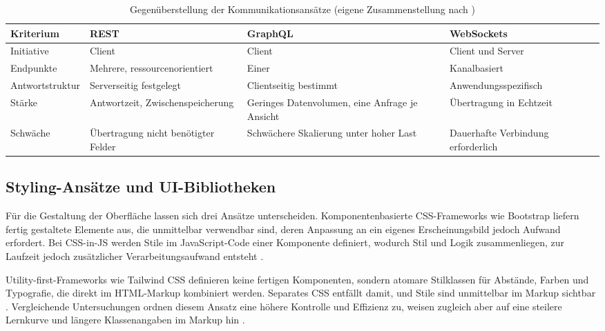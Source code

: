 \begin{table}[htbp]
\centering
\caption{Gegenüberstellung der Kommunikationsansätze (eigene
Zusammenstellung nach \cite{fielding_rest, lawi_graphql_rest,
lloyd_graphql_rest, rfc6455})}
\label{tab:kommunikation}
\small
\begin{tabular}{|p{2.6cm}|p{3.2cm}|p{3.2cm}|p{3.2cm}|}
\hline
\textbf{Kriterium} & \textbf{\acs{REST}} & \textbf{GraphQL} &
\textbf{WebSockets} \\
\hline
Initiative & Client & Client & Client und Server \\
\hline
Endpunkte & Mehrere, ressourcen\-orientiert & Einer &
Kanal\-basiert \\
\hline
Antwort\-struktur & Serverseitig festgelegt &
Clientseitig bestimmt & Anwendungs\-spezifisch \\
\hline
Stärke & Antwortzeit, Zwischen\-speicherung &
Geringes Daten\-volumen, eine Anfrage je Ansicht &
Übertragung in Echtzeit \\
\hline
Schwäche & Über\-tragung nicht benötigter Felder &
Schwächere Skalierung unter hoher Last &
Dauerhafte Verbindung erforderlich \\
\hline
\end{tabular}
\end{table}


\subsection{Styling-Ansätze und UI-Bibliotheken}
\label{subsec:ui-bibliotheken}

Für die Gestaltung der Oberfläche lassen sich drei Ansätze
unterscheiden. Komponentenbasierte \acs{CSS}-Frameworks wie
Bootstrap liefern fertig gestaltete Elemente aus, die unmittelbar
verwendbar sind, deren Anpassung an ein eigenes Erscheinungsbild
jedoch Aufwand erfordert. Bei \acs{CSS}-in-JS werden Stile im
JavaScript-Code einer Komponente definiert, wodurch Stil und Logik
zusammenliegen, zur Laufzeit jedoch zusätzlicher
Verarbeitungsaufwand entsteht \cite{utility_first_comparison}.

Utility-first-Frameworks wie Tailwind CSS definieren keine fertigen
Komponenten, sondern atomare Stilklassen für Abstände, Farben und
Typografie, die direkt im \acs{HTML}-Markup kombiniert werden.
Separates \acs{CSS} entfällt damit, und Stile sind unmittelbar im
Markup sichtbar \cite{tailwindcss_docs}. Vergleichende
Untersuchungen ordnen diesem Ansatz eine höhere Kontrolle und
Effizienz zu, weisen zugleich aber auf eine steilere Lernkurve und
längere Klassenangaben im Markup hin
\cite{utility_first_comparison}.


